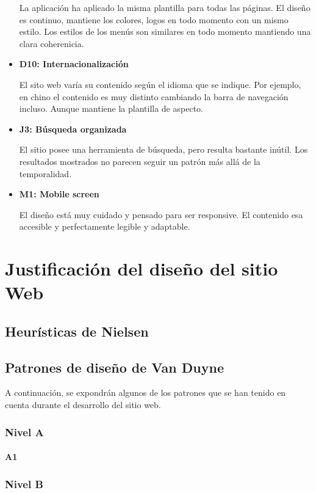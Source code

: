 \documentclass[10pt, spanish, pdftex]{template/UC3M_document}
\begin{document}
\begin{itemize}
  La aplicación ha aplicado la misma plantilla para todas las páginas. El diseño es continuo, mantiene los colores, logos en todo momento con un mismo estilo. Los estilos de los menús son similares en todo momento mantiendo una clara coherenicia.

  \item \textbf{D10: Internacionalización}

  El sito web varía su contenido según el idioma que se indique. Por ejemplo, en chino el contenido es muy distinto cambiando la barra de navegación incluso. Aunque mantiene la plantilla de aspecto.

  \item \textbf{J3: Búsqueda organizada}

  El sitio posee una herramienta de búsqueda, pero resulta bastante inútil. Los resultados mostrados no parecen seguir un patrón más allá de la temporalidad.
  \item \textbf{M1: Mobile screen}

  El diseño está muy cuidado y pensado para ser responsive. El contenido esa accesible y perfectamente legible y adaptable.

\end{itemize}
\pagebreak

\section{Justificación del diseño del sitio Web}
\subsection{Heurísticas de Nielsen}

\subsection{Patrones de diseño de Van Duyne}
A continuación, se expondrán algunos de los patrones que se han tenido en cuenta durante el desarrollo del sitio web.
\subsubsection{Nivel A}
\paragraph{A1}
\subsubsection{Nivel B}
\end{document}
